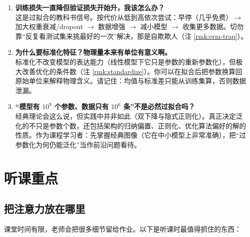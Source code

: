 \documentclass[UTF8,a4paper,11pt]{ctexart}
\theoremstyle{definition}
\theoremstyle{plain}
\theoremstyle{remark}
\begin{document}
\begin{enumerate}[label=\textbf{Q\arabic*.},leftmargin=2.6em]
\item \textbf{训练损失一直降但验证损失开始升，我该怎么办？}\\
这是过拟合的教科书信号。按代价从低到高依次尝试：早停（几乎免费）$\to$ 加大权重衰减/dropout $\to$ 数据增强 $\to$ 减小模型 $\to$ 收集更多数据。切勿靠“反复看测试集来挑最好的一次”解决，那是自欺欺人（注 \ref{rmk:erm-trap}）。

\item \textbf{为什么要标准化特征？物理量本来有单位有意义啊。}\\
标准化不改变模型的表达能力（线性模型下它只是参数的重新参数化），但极大改善优化的条件数（注 \ref{rmk:standardize}）。你可以在拟合后把参数换算回原始单位来解释物理含义。请记住：均值与标准差只能从训练集算，否则数据泄漏。

\item \textbf{“模型有 $10^9$ 个参数、数据只有 $10^6$ 条”不是必然过拟合吗？}\\
经典理论会这么说，但实践中并非如此（双下降与隐式正则化）。真正决定泛化的不只是参数个数，还包括架构的归纳偏置、正则化、优化算法偏好的解的性质。作为课程学习者：先掌握经典图像（它在中小模型上非常准确），把“过参数化为何仍能泛化”当作前沿问题看待。

\end{enumerate}

\section{听课重点}\label{sec:focus}

\subsection{把注意力放在哪里}

课堂时间有限，老师会把很多细节留给作业。以下是听课时最值得抓住的东西：
\end{document}
